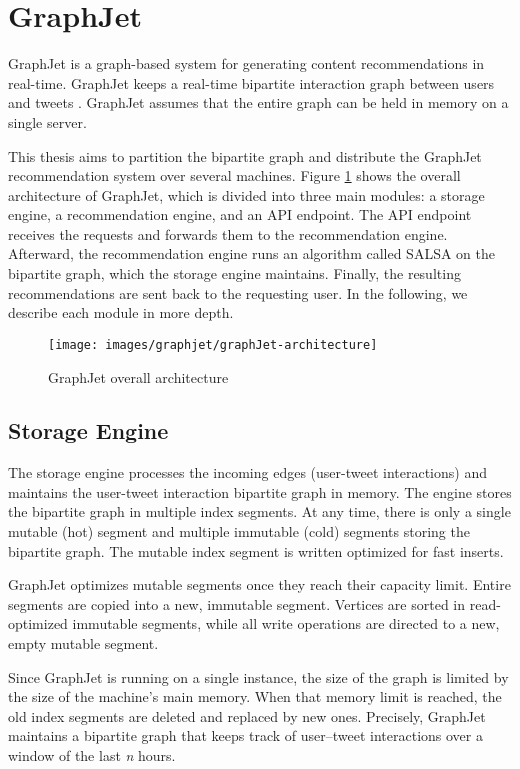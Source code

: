 \section{GraphJet}
\label{sec:GraphJet}
GraphJet is a graph-based system for generating content recommendations in real-time. GraphJet keeps a real-time bipartite interaction graph between users and tweets \cite{sharmaGraphJetRealtimeContent2016}. GraphJet assumes that the entire graph can be held in memory on a single server.

This thesis aims to partition the bipartite graph and distribute the GraphJet recommendation system over several machines. Figure \ref{fig:graphJet-architecture} shows the overall architecture of GraphJet, which is divided into three main modules: a storage engine, a recommendation engine, and an API endpoint. The API endpoint receives the requests and forwards them to the recommendation engine. Afterward, the recommendation engine runs an algorithm called SALSA \cite{lempelSALSAStochasticApproach2001} on the bipartite graph, which the storage engine maintains. Finally, the resulting recommendations are sent back to the requesting user. In the following, we describe each module in more depth.

\begin{figure}[!h]
	\centering
	\texttt{[image: images/graphjet/graphJet-architecture]}
	\caption{GraphJet overall architecture}
	\label{fig:graphJet-architecture}
\end{figure}


\subsection{Storage Engine}
\label{subsec:GraphJet-Storage-Engine}
The storage engine processes the incoming edges (user-tweet interactions) and maintains the user-tweet interaction bipartite graph in memory. The engine stores the bipartite graph in multiple index segments. At any time, there is only a single mutable (hot) segment and multiple immutable (cold) segments storing the bipartite graph. The mutable index segment is written optimized for fast inserts. 

GraphJet optimizes mutable segments once they reach their capacity limit. Entire segments are copied into a new, immutable segment. Vertices are sorted in read-optimized immutable segments, while all write operations are directed to a new, empty mutable segment.

Since GraphJet is running on a single instance, the size of the graph is limited by the size of the machine's main memory. When that memory limit is reached, the old index segments are deleted and replaced by new ones. Precisely, GraphJet maintains a bipartite graph that keeps track of user–tweet interactions over a window of the last \textit{n} hours.

